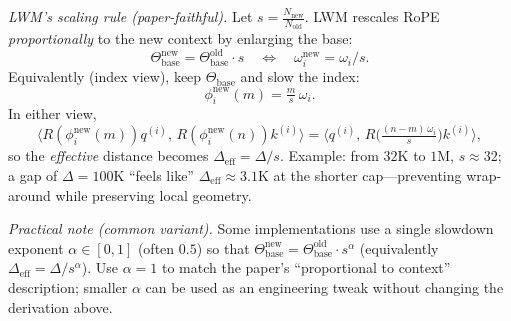 \begin{enrichment}
\begin{enrichment}
        \medskip
        \noindent\textit{LWM’s scaling rule (paper-faithful).}
        Let $s=\tfrac{N_{\text{new}}}{N_{\text{old}}}$. LWM rescales RoPE \emph{proportionally} to the new context by enlarging the base:
        \[
        \Theta_{\text{base}}^{\text{new}}=\Theta_{\text{base}}^{\text{old}}\cdot s
        \quad\Longleftrightarrow\quad
        \omega_i^{\text{new}}=\omega_i/s.
        \]
        Equivalently (index view), keep $\Theta_{\text{base}}$ and slow the index:
        \[
        \phi_i^{\text{new}}(m)=\tfrac{m}{s}\,\omega_i.
        \]
        In either view,
        \[
        \big\langle R(\phi_i^{\text{new}}(m))q^{(i)},\,R(\phi_i^{\text{new}}(n))k^{(i)}\big\rangle
        =
        \big\langle q^{(i)},\,R\!\big(\tfrac{(n{-}m)\,\omega_i}{s}\big)k^{(i)}\big\rangle,
        \]
        so the \emph{effective} distance becomes $\Delta_{\text{eff}}=\Delta/s$.
        Example: from $32\mathrm{K}$ to $1\mathrm{M}$, $s{\approx}32$; a gap of $\Delta{=}100\mathrm{K}$ “feels like” $\Delta_{\text{eff}}\!\approx\!3.1\mathrm{K}$ at the shorter cap—preventing wrap-around while preserving local geometry.
        
        \newpage
        \noindent\textit{Practical note (common variant).}
        Some implementations use a single slowdown exponent $\alpha\!\in\![0,1]$ (often $0.5$) so that
        $\Theta_{\text{base}}^{\text{new}}=\Theta_{\text{base}}^{\text{old}}\cdot s^{\alpha}$
        (equivalently $\Delta_{\text{eff}}=\Delta/s^{\alpha}$).
        Use $\alpha{=}1$ to match the paper’s “proportional to context” description; smaller $\alpha$ can be used as an engineering tweak without changing the derivation above.
        

\end{enrichment}
\end{enrichment}
